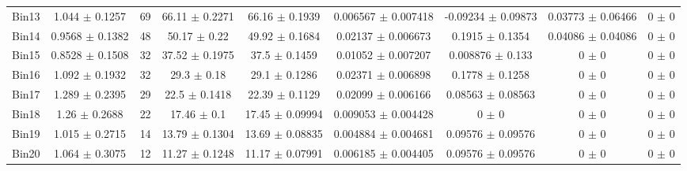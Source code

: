 \begin{tabular}{@{\extracolsep{4pt}}lcccccccc@{}}
     Bin13 & 1.044 $\pm$ 0.1257 & 69 & 66.11 $\pm$ 0.2271 & 66.16 $\pm$ 0.1939 & 0.006567 $\pm$ 0.007418 & -0.09234 $\pm$ 0.09873 & 0.03773 $\pm$ 0.06466 & 0 $\pm$ 0 \\ 
     Bin14 & 0.9568 $\pm$ 0.1382 & 48 & 50.17 $\pm$ 0.22 & 49.92 $\pm$ 0.1684 & 0.02137 $\pm$ 0.006673 & 0.1915 $\pm$ 0.1354 & 0.04086 $\pm$ 0.04086 & 0 $\pm$ 0 \\ 
     Bin15 & 0.8528 $\pm$ 0.1508 & 32 & 37.52 $\pm$ 0.1975 & 37.5 $\pm$ 0.1459 & 0.01052 $\pm$ 0.007207 & 0.008876 $\pm$ 0.133 & 0 $\pm$ 0 & 0 $\pm$ 0 \\ 
     Bin16 & 1.092 $\pm$ 0.1932 & 32 & 29.3 $\pm$ 0.18 & 29.1 $\pm$ 0.1286 & 0.02371 $\pm$ 0.006898 & 0.1778 $\pm$ 0.1258 & 0 $\pm$ 0 & 0 $\pm$ 0 \\ 
     Bin17 & 1.289 $\pm$ 0.2395 & 29 & 22.5 $\pm$ 0.1418 & 22.39 $\pm$ 0.1129 & 0.02099 $\pm$ 0.006166 & 0.08563 $\pm$ 0.08563 & 0 $\pm$ 0 & 0 $\pm$ 0 \\ 
     Bin18 & 1.26 $\pm$ 0.2688 & 22 & 17.46 $\pm$ 0.1 & 17.45 $\pm$ 0.09994 & 0.009053 $\pm$ 0.004428 & 0 $\pm$ 0 & 0 $\pm$ 0 & 0 $\pm$ 0 \\ 
     Bin19 & 1.015 $\pm$ 0.2715 & 14 & 13.79 $\pm$ 0.1304 & 13.69 $\pm$ 0.08835 & 0.004884 $\pm$ 0.004681 & 0.09576 $\pm$ 0.09576 & 0 $\pm$ 0 & 0 $\pm$ 0 \\ 
     Bin20 & 1.064 $\pm$ 0.3075 & 12 & 11.27 $\pm$ 0.1248 & 11.17 $\pm$ 0.07991 & 0.006185 $\pm$ 0.004405 & 0.09576 $\pm$ 0.09576 & 0 $\pm$ 0 & 0 $\pm$ 0 \\ 
\hline\hline
  \end{tabular}

